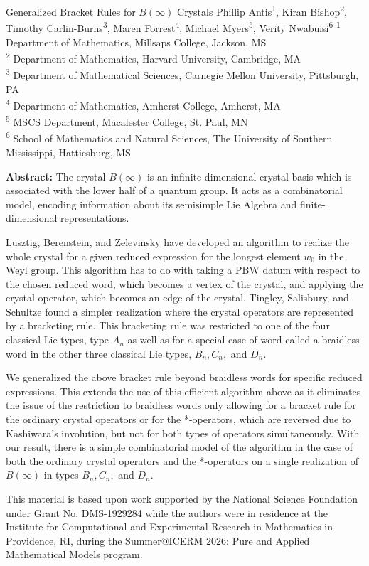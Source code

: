 \makeabstractSHORT
{ %
Generalized Bracket Rules for $B(\infty)$ Crystals
}
{ %
Phillip Antis\textsuperscript{1},
Kiran Bishop\textsuperscript{2},
Timothy Carlin-Burns\textsuperscript{3},
Maren Forrest\textsuperscript{4},
Michael Myers\textsuperscript{5},
Verity Nwabuisi\textsuperscript{6}
}
{ %
\textsuperscript{1} Department of Mathematics, Millsaps College, Jackson, MS\\
\textsuperscript{2} Department of Mathematics, Harvard University, Cambridge, MA\\
\textsuperscript{3} Department of Mathematical Sciences, Carnegie Mellon University, Pittsburgh, PA\\
\textsuperscript{4} Department of Mathematics, Amherst College, Amherst, MA\\
\textsuperscript{5} MSCS Department, Macalester College, St. Paul, MN\\
\textsuperscript{6} School of Mathematics and Natural Sciences, The University of Southern Mississippi, Hattiesburg, MS
}
{ %
\textbf{Abstract:}
The crystal $B(\infty)$ is an infinite-dimensional crystal basis which is associated with the lower half of a quantum group. It acts as a combinatorial model, encoding information about its semisimple Lie Algebra and finite-dimensional representations. 

Lusztig, Berenstein, and Zelevinsky have developed an algorithm to realize the whole crystal for a given reduced expression for the longest element $w_{0}$ in the Weyl group. This algorithm has to do with taking a PBW datum with respect to the chosen reduced word, which becomes a vertex of the crystal, and applying the crystal operator, which becomes an edge of the crystal. Tingley, Salisbury, and Schultze found a simpler realization where the crystal operators are represented by a bracketing rule. This bracketing rule was restricted to one of the four classical Lie types, type $A_{n}$ as well as for a special case of word called a braidless word in the other three classical Lie types, $B_{n}, C_{n},$ and $D_{n}$.

We generalized the above bracket rule beyond braidless words for specific reduced expressions. This extends the use of this efficient algorithm above as it eliminates the issue of the restriction to braidless words only allowing for a bracket rule for the ordinary crystal operators or for the *-operators, which are reversed due to Kashiwara's involution, but not for both types of operators simultaneously. With our result, there is a simple combinatorial model of the algorithm in the case of both the ordinary crystal operators and the *-operators on a single realization of $B(\infty)$ in types $B_{n}, C_{n},$ and $D_{n}$.


This material is based upon work supported by the National Science Foundation under Grant No. DMS-1929284 while the authors were in residence at the Institute for Computational and Experimental Research in Mathematics in Providence, RI, during the Summer@ICERM 2026: Pure and Applied Mathematical Models program.
}
 \newpage